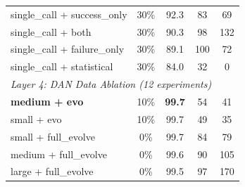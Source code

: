 \begin{table}[t]
\begin{tabular}{lcccc}
single\_call + success\_only & 30\% & 92.3 & 83 & 69 \\
single\_call + both & 30\% & 90.3 & 98 & 132 \\
single\_call + failure\_only & 30\% & 89.1 & 100 & 72 \\
single\_call + statistical & 30\% & 84.0 & 32 & 0 \\
\midrule
\multicolumn{5}{l}{\textit{Layer 4: DAN Data Ablation (12 experiments)}} \\
\textbf{medium + evo} & 10\% & \textbf{99.7} & 54 & 41 \\
small + evo & 10\% & 99.7 & 49 & 35 \\
small + full\_evolve & 0\% & 99.7 & 84 & 79 \\
medium + full\_evolve & 0\% & 99.6 & 90 & 105 \\
large + full\_evolve & 0\% & 99.5 & 97 & 170 \\
\bottomrule
\end{tabular}
\end{table}
